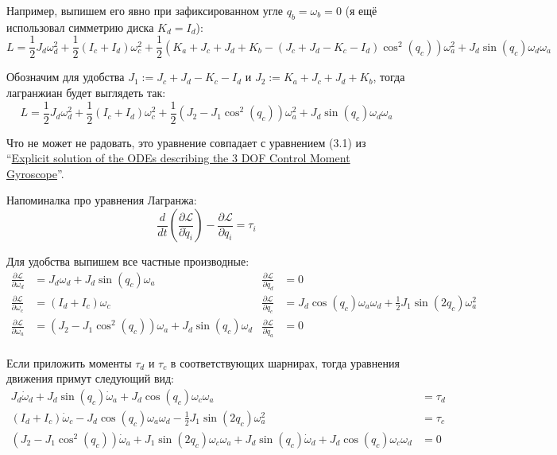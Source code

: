\documentclass{article}
\begin{document}
Например, выпишем его явно при зафиксированном угле $q_b=\omega_b=0$ (я ещё использовал симметрию диска $K_d=I_d$):
$$
L=\frac{1}{2}J_d \omega_d^2 + \frac{1}{2}(I_c+I_d) \omega_c^2 + \frac{1}{2}\left(K_a+J_c+J_d+K_b - (J_c+J_d-K_c-I_d) \cos^2(q_c)\right) \omega_a^2 + J_d \sin(q_c) \omega_d \omega_a
$$

Обозначим для удобства $J_1:=J_c+J_d-K_c-I_d$ и $J_2:=K_a+J_c+J_d+K_b$, тогда лагранжиан будет выглядеть так:
$$
L=\frac{1}{2}J_d \omega_d^2 + \frac{1}{2}(I_c+I_d) \omega_c^2 + \frac{1}{2}\left(J_2 - J_1 \cos^2(q_c)\right) \omega_a^2 + J_d \sin(q_c) \omega_d \omega_a
$$


Что не может не радовать, это уравнение совпадает с уравнением (3.1) из ``\href{http://www.mate.tue.nl/mate/pdfs/9731.pdf}{Explicit solution of the ODEs describing the 3 DOF Control Moment Gyroscope}''.

Напоминалка про уравнения Лагранжа:
$$
\frac{d}{dt}\left(\frac{\partial\mathcal L}{\partial\dot q_i}\right) - \frac{\partial\mathcal L}{\partial q_i} = \tau_i
$$

Для удобства выпишем все частные производные:
\begin{align*}
\frac{\partial\mathcal L}{\partial\omega_d} &=  J_d \omega_d + J_d \sin(q_c) \omega_a & \frac{\partial\mathcal L}{\partial q_d} & =  0\\
\frac{\partial\mathcal L}{\partial\omega_c} &= (I_d+I_c)\omega_c                      & \frac{\partial\mathcal L}{\partial q_c} &= J_d \cos(q_c) \omega_a \omega_d + \frac{1}{2}J_1  \sin(2 q_c) \omega_a^2  \\
\frac{\partial\mathcal L}{\partial\omega_a} &= \left(J_2 - J_1 \cos^2(q_c)\right) \omega_a  + J_d \sin(q_c) \omega_d  & \frac{\partial\mathcal L}{\partial q_a}   &= 0\\
\end{align*}

Если приложить моменты $\tau_d$ и $\tau_c$ в соответствующих шарнирах, тогда уравнения движения примут следующий вид:
\begin{align*}
 J_d \dot\omega_d + J_d \sin(q_c)\dot \omega_a + J_d \cos(q_c)\omega_c\omega_a &=\tau_d\\
(I_d+I_c)\dot\omega_c - J_d \cos(q_c) \omega_a \omega_d - \frac{1}{2}J_1  \sin(2 q_c) \omega_a^2  &= \tau_c \\
\left(J_2 - J_1 \cos^2(q_c)\right)\dot \omega_a + J_1 \sin(2 q_c)\omega_c\omega_a +  J_d \sin(q_c) \dot\omega_d + J_d \cos(q_c) \omega_c\omega_d &= 0\\
\end{align*}
\end{document}
